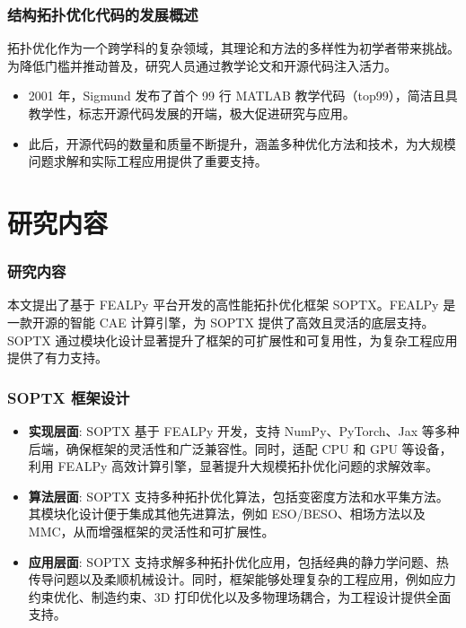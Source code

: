 \documentclass{beamer}  %
\numberwithin{subsection}{section}             %
\begin{document}
\begin{frame}
\frametitle{结构拓扑优化代码的发展概述}
\small{
拓扑优化作为一个跨学科的复杂领域，其理论和方法的多样性为初学者带来挑战。为降低门槛并推动普及，研究人员通过教学论文和开源代码注入活力。
\begin{itemize}
	\item 2001 年，Sigmund 发布了首个 99 行 MATLAB 教学代码（top99），简洁且具教学性，标志开源代码发展的开端，极大促进研究与应用。
	\item 此后，开源代码的数量和质量不断提升，涵盖多种优化方法和技术，为大规模问题求解和实际工程应用提供了重要支持。
\end{itemize}
}
\end{frame}

\section{研究内容}
\begin{frame}
\frametitle{研究内容}
\small{
本文提出了基于 FEALPy 平台开发的高性能拓扑优化框架 SOPTX。FEALPy 是一款开源的智能 CAE 计算引擎，为 SOPTX 提供了高效且灵活的底层支持。SOPTX 通过模块化设计显著提升了框架的可扩展性和可复用性，为复杂工程应用提供了有力支持。
}
\end{frame}

\begin{frame}
\frametitle{SOPTX 框架设计}
\small{
\begin{itemize}
	\item \textbf{实现层面}: SOPTX 基于 FEALPy 开发，支持 NumPy、PyTorch、Jax 等多种后端，确保框架的灵活性和广泛兼容性。同时，适配 CPU 和 GPU 等设备，利用 FEALPy  高效计算引擎，显著提升大规模拓扑优化问题的求解效率。
		
	\item \textbf{算法层面}: SOPTX 支持多种拓扑优化算法，包括变密度方法和水平集方法。其模块化设计便于集成其他先进算法，例如 ESO/BESO、相场方法以及 MMC，从而增强框架的灵活性和可扩展性。
	 
	\item \textbf{应用层面}: SOPTX 支持求解多种拓扑优化应用，包括经典的静力学问题、热传导问题以及柔顺机械设计。同时，框架能够处理复杂的工程应用，例如应力约束优化、制造约束、3D 打印优化以及多物理场耦合，为工程设计提供全面支持。
\end{itemize}
}
\end{frame}
\end{document}
